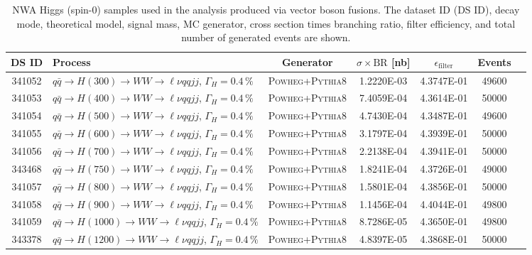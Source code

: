 \begin{landscape}
\begin{table}[!htb]
\caption[Narrow Higgs Monte Carlo samples (vector boson fusion production)]{NWA Higgs (spin-0) samples used in the analysis produced via vector boson fusions. 
The dataset ID (DS ID), decay mode, theoretical model, signal mass, MC generator, cross section times branching ratio, filter efficiency, and total number of generated events are shown.}
\label{tabular:mc_samples_VBFH_NWA}
\begin{footnotesize}
\begin{center}
\begin{tabular}{c|l|c|c|c|cr}
	\hline\hline
	DS ID & Process & Generator & $\sigma\times\text{BR}$ [nb] & $\epsilon_{\text{filter}}$ & Events \\ \hline\hline
	341052 & $q\bar{q} \to H(300) \to WW \to \ell\nu qq  jj$, $\Gamma_H=0.4\,\%$ & \textsc{Powheg}+\textsc{Pythia8} & 1.2220E-03 & 4.3747E-01 & 49600 \\
	341053 & $q\bar{q} \to H(400) \to WW \to \ell\nu qq  jj$, $\Gamma_H=0.4\,\%$ & \textsc{Powheg}+\textsc{Pythia8} & 7.4059E-04 & 4.3614E-01 & 50000 \\
	341054 & $q\bar{q} \to H(500) \to WW \to \ell\nu qq  jj$, $\Gamma_H=0.4\,\%$ & \textsc{Powheg}+\textsc{Pythia8} & 4.7430E-04 & 4.3487E-01 & 49600 \\
	341055 & $q\bar{q} \to H(600) \to WW \to \ell\nu qq  jj$, $\Gamma_H=0.4\,\%$ & \textsc{Powheg}+\textsc{Pythia8} & 3.1797E-04 & 4.3939E-01 & 50000 \\
	341056 & $q\bar{q} \to H(700) \to WW \to \ell\nu qq  jj$, $\Gamma_H=0.4\,\%$ & \textsc{Powheg}+\textsc{Pythia8} & 2.2138E-04 & 4.3941E-01 & 50000 \\
	343468 & $q\bar{q} \to H(750) \to WW \to \ell\nu qq  jj$, $\Gamma_H=0.4\,\%$ & \textsc{Powheg}+\textsc{Pythia8} & 1.8241E-04 & 4.3726E-01 & 49000 \\
	341057 & $q\bar{q} \to H(800) \to WW \to \ell\nu qq  jj$, $\Gamma_H=0.4\,\%$ & \textsc{Powheg}+\textsc{Pythia8} & 1.5801E-04 & 4.3856E-01 & 50000 \\
	341058 & $q\bar{q} \to H(900) \to WW \to \ell\nu qq  jj$, $\Gamma_H=0.4\,\%$ & \textsc{Powheg}+\textsc{Pythia8} & 1.1456E-04 & 4.4044E-01 & 49800 \\
	341059 & $q\bar{q} \to H(1000) \to WW \to \ell\nu qq  jj$, $\Gamma_H=0.4\,\%$ & \textsc{Powheg}+\textsc{Pythia8} & 8.7286E-05 & 4.3650E-01 & 49800 \\
	343378 & $q\bar{q} \to H(1200) \to WW \to \ell\nu qq  jj$, $\Gamma_H=0.4\,\%$ & \textsc{Powheg}+\textsc{Pythia8} & 4.8397E-05 & 4.3868E-01 & 50000 \\

\end{tabular}
\end{center}
\end{footnotesize}
\end{table}
\end{landscape}
